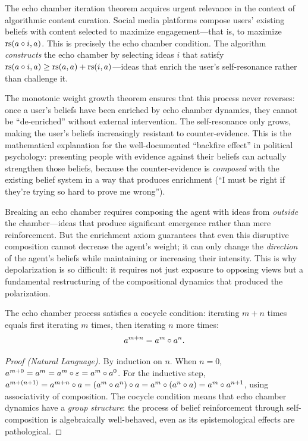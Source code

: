 \begin{remark}
The echo chamber iteration theorem acquires urgent relevance in the context of
algorithmic content curation. Social media platforms compose users' existing
beliefs with content selected to maximize engagement---that is, to maximize
$\mathrm{rs}(a \circ i, a)$. This is precisely the echo chamber condition. The
algorithm \emph{constructs} the echo chamber by selecting ideas $i$ that
satisfy $\mathrm{rs}(a \circ i, a) \geq \mathrm{rs}(a, a) + \mathrm{rs}(i, a)$---ideas that
enrich the user's self-resonance rather than challenge it.

The monotonic weight growth theorem ensures that this process never reverses:
once a user's beliefs have been enriched by echo chamber dynamics, they cannot
be ``de-enriched'' without external intervention. The self-resonance only grows,
making the user's beliefs increasingly resistant to counter-evidence. This is the
mathematical explanation for the well-documented ``backfire effect'' in political
psychology: presenting people with evidence against their beliefs can actually
strengthen those beliefs, because the counter-evidence is \emph{composed} with
the existing belief system in a way that produces enrichment (``I must be right
if they're trying so hard to prove me wrong'').

Breaking an echo chamber requires composing the agent with ideas from \emph{outside}
the chamber---ideas that produce significant emergence rather than mere
reinforcement. But the enrichment axiom guarantees that even this disruptive
composition cannot decrease the agent's weight; it can only change the
\emph{direction} of the agent's beliefs while maintaining or increasing their
intensity. This is why depolarization is so difficult: it requires not just
exposure to opposing views but a fundamental restructuring of the compositional
dynamics that produced the polarization.
\end{remark}

\begin{theorem}
\label{thm:echo-chamber-cocycle}
The echo chamber process satisfies a cocycle condition: iterating $m + n$ times
equals first iterating $m$ times, then iterating $n$ more times:
\[
  a^{m+n} = a^m \circ a^n.
\]
\end{theorem}

\begin{proof}[Proof (Natural Language)]
By induction on $n$. When $n = 0$, $a^{m+0} = a^m = a^m \circ \varepsilon =
a^m \circ a^0$. For the inductive step, $a^{m+(n+1)} = a^{m+n} \circ a
= (a^m \circ a^n) \circ a = a^m \circ (a^n \circ a) = a^m \circ
a^{n+1}$, using associativity of composition. The cocycle condition means that
echo chamber dynamics have a \emph{group structure}: the process of belief
reinforcement through self-composition is algebraically well-behaved, even as
its epistemological effects are pathological.
\end{proof}


